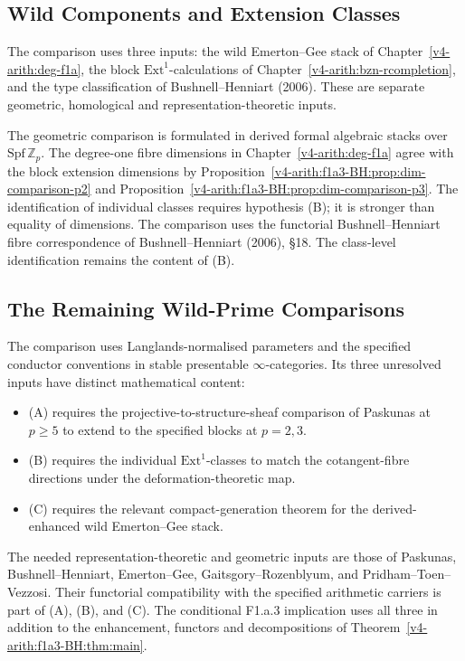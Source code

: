 \subsection{Wild Components and Extension Classes}

The comparison uses three inputs: the wild Emerton--Gee stack of
Chapter~\ref{v4-arith:deg-f1a}, the block
\(\mathrm{Ext}^{1}\)-calculations of
Chapter~\ref{v4-arith:bzn-rcompletion}, and the type classification
of Bushnell--Henniart (2006). These are separate geometric,
homological and representation-theoretic inputs.

The geometric comparison is formulated in derived formal algebraic
stacks over \(\mathrm{Spf}\,\mathbb Z_p\). The degree-one fibre
dimensions in Chapter~\ref{v4-arith:deg-f1a} agree with the block
extension dimensions by
Proposition~\ref{v4-arith:f1a3-BH:prop:dim-comparison-p2} and
Proposition~\ref{v4-arith:f1a3-BH:prop:dim-comparison-p3}.
The identification of individual classes requires hypothesis (B);
it is stronger than equality of dimensions.
The comparison uses the functorial Bushnell--Henniart fibre
correspondence of Bushnell--Henniart (2006), \S18.
The class-level identification remains the content of (B).

\subsection{The Remaining Wild-Prime Comparisons}

The comparison uses Langlands-normalised parameters and the specified
conductor conventions in stable presentable \(\infty\)-categories.
Its three unresolved inputs have distinct mathematical content:
\begin{itemize}
\item (A) requires the projective-to-structure-sheaf comparison of
Paskunas at \(p\ge5\) to extend to the specified blocks at \(p=2,3\).
\item (B) requires the individual \(\mathrm{Ext}^1\)-classes to match
the cotangent-fibre directions under the deformation-theoretic map.
\item (C) requires the relevant compact-generation theorem for the
derived-enhanced wild Emerton--Gee stack.
\end{itemize}
The needed representation-theoretic and geometric inputs are those
of Paskunas, Bushnell--Henniart, Emerton--Gee,
Gaitsgory--Rozenblyum, and Pridham--Toen--Vezzosi.
Their functorial compatibility with the specified arithmetic carriers
is part of (A), (B), and (C). The conditional F1.a.3 implication uses
all three in addition to the enhancement, functors and decompositions
of Theorem~\ref{v4-arith:f1a3-BH:thm:main}.

